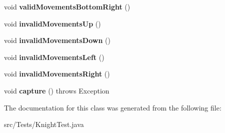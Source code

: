 \begin{DoxyCompactItemize}
\mbox{\label{class_tests_1_1_knight_test_a055d87ed6d511ff80c404b7933dc11f4}} 
void {\bfseries valid\+Movements\+Bottom\+Right} ()
\item 
\mbox{\label{class_tests_1_1_knight_test_a82485a7cedb48ae900622c566d7327cc}} 
void {\bfseries invalid\+Movements\+Up} ()
\item 
\mbox{\label{class_tests_1_1_knight_test_ae43351baa72d32b1e764a1d251622643}} 
void {\bfseries invalid\+Movements\+Down} ()
\item 
\mbox{\label{class_tests_1_1_knight_test_a624326c362ee889e10eac3b885c5a1f9}} 
void {\bfseries invalid\+Movements\+Left} ()
\item 
\mbox{\label{class_tests_1_1_knight_test_a8860770b22c5e47d71582b7915b0306a}} 
void {\bfseries invalid\+Movements\+Right} ()
\item 
\mbox{\label{class_tests_1_1_knight_test_aec4b46ca7b8b017d354cc9931b567ae2}} 
void {\bfseries capture} ()  throws Exception 
\end{DoxyCompactItemize}


The documentation for this class was generated from the following file\+:\begin{DoxyCompactItemize}
\item 
src/\+Tests/Knight\+Test.\+java\end{DoxyCompactItemize}
